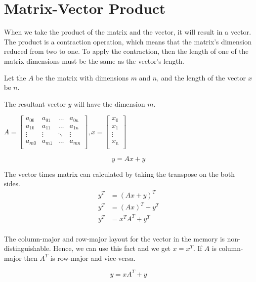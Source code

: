 \chapter{Matrix-Vector Product}

When we take the product of the matrix and the vector, 
it will result in a vector. The product is a contraction 
operation, which means that the matrix's dimension reduced from two to one.
To apply the contraction, then the length of one of the matrix dimensions 
must be the same as the vector's length.

Let the $A$ be the matrix with dimensions $m$ and $n$, 
and the length of the vector $x$ be $n$.

The resultant vector $y$ will have the dimension $m$.

\vspace*{0.5 cm}
$
A = 
\begin{bmatrix}
    a_{00}  & a_{01}    & \dots     & a_{0n}\\
    a_{10}  & a_{11}    & \dots     & a_{1n}\\
    \vdots  & \vdots    & \ddots    & \vdots\\
    a_{m0}  & a_{m1}    & \dots     & a_{mn}\\
\end{bmatrix}
, x =
\begin{bmatrix}
    x_0\\
    x_1\\
    \vdots\\
    x_n\\
\end{bmatrix}
$

\begin{equation}
    y = Ax + y
    \label{eq:mtv}
\end{equation}

The vector times matrix can calculated by taking the transpose on the both sides.
\begin{align*}
    y^T &= (Ax + y)^T\\
    y^T &= (Ax)^T + y^T\\
    y^T &= x^TA^T + y^T\\
\end{align*}

The column-major and row-major layout for the vector in the memory 
is non-distinguishable. Hence, we can use this fact and we get $x = x^T$.
If $A$ is column-major then $A^T$ is row-major and vice-versa.

\begin{equation}
    y = xA^T + y
    \label{eq:vtm}
\end{equation}
